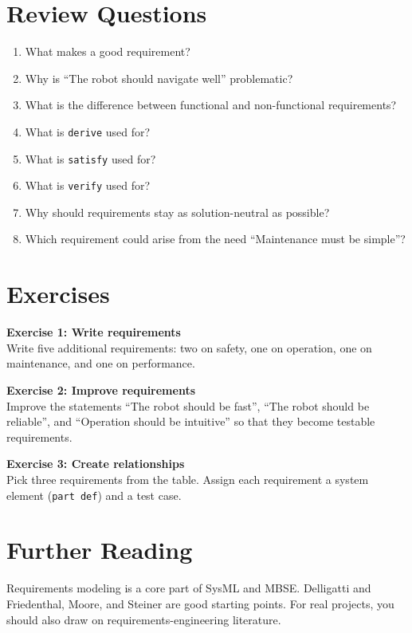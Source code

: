 \section{Review Questions}
\begin{enumerate}
    \item What makes a good requirement?
    \item Why is \enquote{The robot should navigate well} problematic?
    \item What is the difference between functional and non-functional requirements?
    \item What is \texttt{derive} used for?
    \item What is \texttt{satisfy} used for?
    \item What is \texttt{verify} used for?
    \item Why should requirements stay as solution-neutral as possible?
    \item Which requirement could arise from the need \enquote{Maintenance must be simple}?
\end{enumerate}

\section{Exercises}
\begin{uebungbox}
\textbf{Exercise 1: Write requirements}\\
Write five additional requirements: two on safety, one on operation, one on maintenance, and one on performance.
\end{uebungbox}

\begin{uebungbox}
\textbf{Exercise 2: Improve requirements}\\
Improve the statements \enquote{The robot should be fast}, \enquote{The robot should be reliable}, and \enquote{Operation should be intuitive} so that they become testable requirements.
\end{uebungbox}

\begin{uebungbox}
\textbf{Exercise 3: Create relationships}\\
Pick three requirements from the table. Assign each requirement a system element (\texttt{part def}) and a test case.
\end{uebungbox}

\section{Further Reading}
Requirements modeling is a core part of SysML and MBSE. Delligatti \cite{delligatti2014} and Friedenthal, Moore, and Steiner \cite{friedenthal2014} are good starting points. For real projects, you should also draw on requirements-engineering literature.
